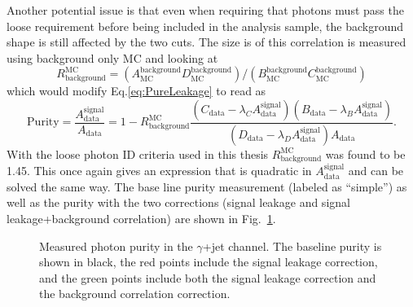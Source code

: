Another potential issue is that even when requiring that photons must pass the loose requirement before being included in the analysis sample, the background shape is still affected by the two cuts.  
The size is of this correlation is measured using background only MC and looking at 
\begin{equation}
 R^{\mathrm{MC}}_{\mathrm {background}}= \left(A_{\mathrm{MC}}^{\mathrm{background}}D_{\mathrm{MC}}^{\mathrm{background}}\right)/\left(B_{\mathrm{MC}}^{\mathrm{background}}C_{\mathrm{MC}}^{\mathrm{background}}\right) 
\end{equation} 
which would modify Eq.\ref{eq:PureLeakage} to read as
\begin{equation}
  \mathrm{Purity} = \frac{A_{\mathrm{data}}^{\mathrm{signal}}}{A_{\mathrm{data}}} = 1-R^{\mathrm{MC}}_{\mathrm {background}}\frac{\left(C_{\mathrm{data}}-\lambda_CA_{\mathrm{data}}^{\mathrm{signal}}\right)\left(B_{\mathrm{data}}-\lambda_BA_{\mathrm{data}}^{\mathrm{signal}}\right)}{\left(D_{\mathrm{data}}-\lambda_DA_{\mathrm{data}}^{\mathrm{signal}}\right)A_{\mathrm{data}}}.  
\end{equation}
With the loose photon ID criteria used in this thesis $R^{\mathrm{MC}}_{\mathrm {background}}$ was found to be 1.45.  
This once again gives an expression that is quadratic in $A_{\mathrm{data}}^{\mathrm{signal}}$ and can be solved the same way.  
The base line purity measurement (labeled as ``simple'') as well as the purity with the two corrections (signal leakage and signal leakage+background correlation) are shown in Fig.~\ref{fig:PurityMeas}.  
\begin{figure}[!ht]
 \begin{center}
 \end{center}
 \caption[$\gamma$+jet purity measurement]
 {\small Measured photon purity in the $\gamma$+jet channel.  The baseline purity is shown in black, the red points include the signal leakage correction, and the green points include both the signal leakage correction and the background correlation correction. }
 \label{fig:PurityMeas}
\end{figure}

